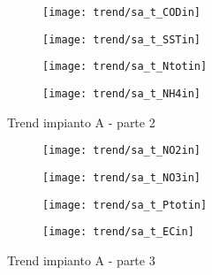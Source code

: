 \begin{sidewaysfigure}[h]\ContinuedFloat
	\renewcommand*\thesubfigure{(\arabic{subfigure})}
	\begin{subfigure}{0.49\textwidth}
		\texttt{[image: trend/sa\_t\_CODin]}
		\caption{}
		\centering
	\end{subfigure}
	\begin{subfigure}{0.49\textwidth}
		\texttt{[image: trend/sa\_t\_SSTin]}
		\caption{}
		\centering
	\end{subfigure}

	\begin{subfigure}{0.49\textwidth}
		\texttt{[image: trend/sa\_t\_Ntotin]}
		\caption{}
		\centering
	\end{subfigure}
	\begin{subfigure}{0.49\textwidth}
		\texttt{[image: trend/sa\_t\_NH4in]}	
		\caption{}
		\label{fig:sa_t_NH4in}
		\centering
	\end{subfigure}
	\caption{Trend impianto A - parte 2}
\end{sidewaysfigure}

\begin{sidewaysfigure}[h]\ContinuedFloat
	\renewcommand*\thesubfigure{(\arabic{subfigure})}
	\begin{subfigure}{0.49\textwidth}
		\texttt{[image: trend/sa\_t\_NO2in]}
		\caption{}
		\label{fig:sa_t_NO2in}
		\centering
	\end{subfigure}
	\begin{subfigure}{0.49\textwidth}
		\texttt{[image: trend/sa\_t\_NO3in]}
		\caption{}
		\centering
	\end{subfigure}

	\begin{subfigure}{0.49\textwidth}
		\texttt{[image: trend/sa\_t\_Ptotin]}
		\caption{}
		\label{fig:sa_t_Ptotin}
		\centering
	\end{subfigure}
	\begin{subfigure}{0.49\textwidth}
		\texttt{[image: trend/sa\_t\_ECin]}	
		\caption{}
		\centering
	\end{subfigure}
	\caption{Trend impianto A - parte 3}
\end{sidewaysfigure}

